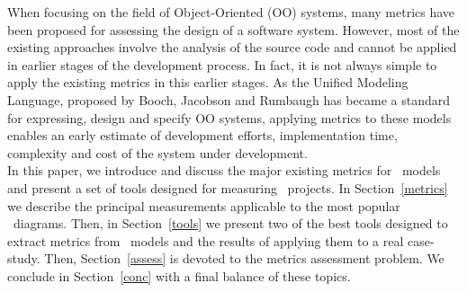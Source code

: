 When focusing on the field of Object-Oriented (OO) systems, many metrics have been proposed for assessing the design of a software system.
However, most of the existing approaches involve the analysis of the source code and cannot be applied in earlier stages of the development process.
In fact, it is not always simple to apply the existing metrics in this earlier stages. 
As the \textsf{Unified Modeling Language}, proposed by Booch, Jacobson and Rumbaugh\cite{USDPuml} has became a standard for expressing, design and specify OO systems, applying metrics to these models enables an early estimate of development efforts, implementation time, complexity and cost of the system under development. \\

In this paper, we introduce and discuss the major existing metrics for \uml\ models and present a set of tools designed for measuring \uml\ projects.
In Section~\ref{metrics} we describe the principal measurements applicable to the most popular \uml\ diagrams.
Then, in Section~\ref{tools} we present two of the best tools designed to extract metrics from \uml\ models and the results of applying them to a real case-study.
Then, Section~\ref{assess} is devoted to the metrics assessment problem.
We conclude in Section~\ref{conc} with a final balance of these topics.


